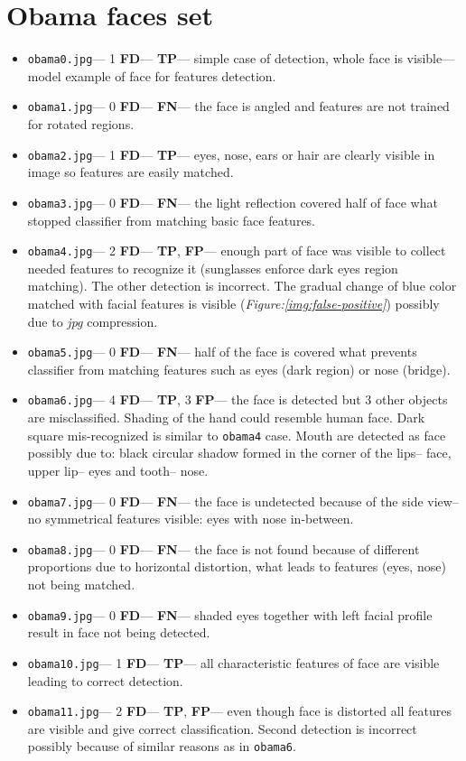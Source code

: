 \documentclass[11pt,a4paper,twocolumn]{article}
\begin{document}
\section*{Obama faces set}
\begin{itemize}
\item \texttt{obama0.jpg}--- 1 \textbf{FD}--- \textbf{TP}--- simple case of detection, whole face is visible--- model example of face for features detection.
\item \texttt{obama1.jpg}--- 0 \textbf{FD}--- \textbf{FN}--- the face is angled and features are not trained for rotated regions.
\item \texttt{obama2.jpg}--- 1 \textbf{FD}--- \textbf{TP}--- eyes, nose, ears or hair are clearly visible in image so features are easily matched.
\item \texttt{obama3.jpg}--- 0 \textbf{FD}--- \textbf{FN}--- the light reflection covered half of face what stopped classifier from matching basic face features.
\item \texttt{obama4.jpg}--- 2 \textbf{FD}--- \textbf{TP}, \textbf{FP}--- enough part of face was visible to collect needed features to recognize it (sunglasses enforce dark eyes region matching). The other detection is incorrect. The gradual change of blue color matched with facial features is visible (\textit{Figure:\ref{img:false-positive}}) possibly due to \textit{jpg} compression.
\item \texttt{obama5.jpg}--- 0 \textbf{FD}--- \textbf{FN}--- half of the face is covered what prevents classifier from matching features such as eyes (dark region) or nose (bridge).
\item \texttt{obama6.jpg}--- 4 \textbf{FD}--- \textbf{TP}, 3 \textbf{FP}--- the face is detected but 3 other objects are misclassified. Shading of the hand could resemble human face. Dark square mis-recognized is similar to \texttt{obama4} case. Mouth are detected as face possibly due to: black circular shadow formed in the corner of the lips-- face, upper lip-- eyes and tooth-- nose.
\item \texttt{obama7.jpg}--- 0 \textbf{FD}--- \textbf{FN}--- the face is undetected because of the side view-- no symmetrical features visible: eyes with nose in-between.
\item \texttt{obama8.jpg}--- 0 \textbf{FD}--- \textbf{FN}--- the face is not found because of different proportions due to horizontal distortion, what leads to features (eyes, nose) not being matched.
\item \texttt{obama9.jpg}--- 0 \textbf{FD}--- \textbf{FN}--- shaded eyes together with left facial profile result in face not being detected.
\item \texttt{obama10.jpg}--- 1 \textbf{FD}--- \textbf{TP}--- all characteristic features of face are visible leading to correct detection.
\item \texttt{obama11.jpg}--- 2 \textbf{FD}--- \textbf{TP}, \textbf{FP}--- even though face is distorted all features are visible and give correct classification. Second detection is incorrect possibly because of similar reasons as in \texttt{obama6}.
\end{itemize}
\end{document}
